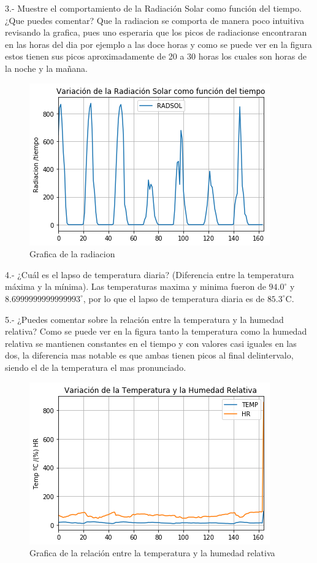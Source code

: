 \documentclass{article}
\begin{document}
3.- Muestre el comportamiento de la Radiación Solar como función del tiempo. ¿Que puedes comentar?
\newline
Que la radiacion se comporta de manera poco intuitiva revisando la grafica, pues uno esperaria que los picos de radiacionse encontraran en las horas del dia por ejemplo a las doce horas y como se puede ver en la figura estos tienen sus picos aproximadamente de 20 a 30 horas los cuales son horas de la noche y la mañana.

\begin{figure}[H]
\centering
\includegraphics[scale=0.6]{radiacion.png}
\caption{Grafica de la radiacion}
\label{figure: Radiacion}
\end{figure}

4.- ¿Cuál es el lapso de temperatura diaria? (Diferencia entre la temperatura máxima y la mínima).
\newline
Las temperaturas maxima y minima fueron de $94.0^{\circ}$ y $8.6999999999999993^{\circ}$, por lo que el lapso de temperatura diaria es de $85.3^{\circ}$C.

5.- ¿Puedes comentar sobre la relación entre la temperatura y la humedad relativa?
\newline
Como se puede ver en la figura tanto la temperatura como la humedad relativa se mantienen constantes en el tiempo y con valores casi iguales en las dos, la diferencia mas notable es que ambas tienen picos al final delintervalo, siendo el de la temperatura el mas pronunciado.

\begin{figure}[H]
\centering
\includegraphics[scale=0.6]{relativa.png}
\caption{Grafica de la relación entre la temperatura y la humedad relativa}
\label{figure: temperatura y la humedad relativa}
\end{figure}
\end{document}
